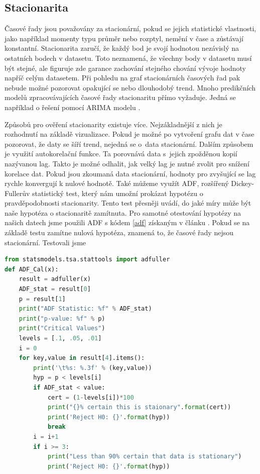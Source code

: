 \subsection{Stacionarita}

Časové řady jsou považovány za stacionární, pokud se jejich statistické vlastnosti, jako například momenty typu průměr nebo rozptyl, nemění v čase a zůstávají konstantní. 
Stacionarita zaručí, že každý bod je svojí hodnotou nezávislý na ostatních bodech v datasetu.
Toto neznamená, že všechny body v datasetu musí být stejné, ale figuruje zde garance zachování stejného chování vývoje hodnoty napříč celým datasetem. 
Při pohledu na graf stacionárních časových řad pak nebude možné pozorovat opakující se nebo dlouhodobý trend. 
Mnoho predikčních modelů zpracovávajících časové řady stacionaritu přímo vyžaduje. 
Jedná se například o řešení pomocí ARIMA modelu \cite{stationary:1, stationary:1}.

Způsobů pro ověření stacionarity existuje více. Nejzákladnější z nich je rozhodnutí na základě vizualizace. 
Pokud je možné po vytvoření grafu dat v čase pozorovat, že daty se šíří trend, nejedná se o~data stacionární. 
Dalším způsobem je využití autokorelační funkce. 
Ta porovnává data s~jejich zpožděnou kopií nazývanou lag. 
Takto je možné odhalit, jak velký lag je nutné zvolit pro snížení korelace dat. 
Pokud jsou zkoumaná data stacionární, hodnoty pro zvyšující se lag rychle konvergují k nulové hodnotě. 
Také můžeme využít ADF, rozšířený Dickey-Fullerův statistický test, který nám umožní prokázat hypotézu o pravděpodobnosti stacionarity. 
Tento test přesněji uvádí, do jaké míry může být naše hypotéza o stacionaritě zamítnuta. 
Pro samotné otestování hypotézy na našich datech jsme použili ADF s kódem \ref{adf} získaným v článku  \cite{adf}. Pokud se na základě testu zamítne nulová hypotéza, znamená to, že časové řady nejsou stacionární. Testovali jsme 

\begin{lstlisting}[caption={~ADF},label=adf,captionpos=t,float,abovecaptionskip=-\medskipamount,belowcaptionskip=\medskipamount,language=Python]
from statsmodels.tsa.stattools import adfuller
def ADF_Cal(x):
    result = adfuller(x)
    ADF_stat = result[0]
    p = result[1]
    print("ADF Statistic: %f" % ADF_stat)
    print("p-value: %f" % p)
    print("Critical Values")
    levels = [.1, .05, .01]
    i = 0
    for key,value in result[4].items():
        print('\t%s: %.3f' % (key,value))
        hyp = p < levels[i]
        if ADF_stat < value:
            cert = (1-levels[i])*100
            print("{}% certain this is staionary".format(cert))
            print('Reject H0: {}'.format(hyp))
            break
        i = i+1
        if i >= 3:
            print("Less than 90% certain that data is stationary")
            print('Reject H0: {}'.format(hyp))
\end{lstlisting}


